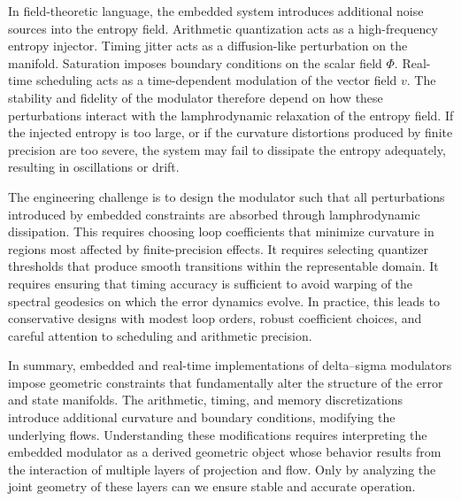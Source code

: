 In field-theoretic language, the embedded system introduces additional noise sources into the entropy field. Arithmetic quantization acts as a high-frequency entropy injector. Timing jitter acts as a diffusion-like perturbation on the manifold. Saturation imposes boundary conditions on the scalar field \(\Phi\). Real-time scheduling acts as a time-dependent modulation of the vector field \(v\). The stability and fidelity of the modulator therefore depend on how these perturbations interact with the lamphrodynamic relaxation of the entropy field. If the injected entropy is too large, or if the curvature distortions produced by finite precision are too severe, the system may fail to dissipate the entropy adequately, resulting in oscillations or drift.

The engineering challenge is to design the modulator such that all perturbations introduced by embedded constraints are absorbed through lamphrodynamic dissipation. This requires choosing loop coefficients that minimize curvature in regions most affected by finite-precision effects. It requires selecting quantizer thresholds that produce smooth transitions within the representable domain. It requires ensuring that timing accuracy is sufficient to avoid warping of the spectral geodesics on which the error dynamics evolve. In practice, this leads to conservative designs with modest loop orders, robust coefficient choices, and careful attention to scheduling and arithmetic precision.

In summary, embedded and real-time implementations of delta–sigma modulators impose geometric constraints that fundamentally alter the structure of the error and state manifolds. The arithmetic, timing, and memory discretizations introduce additional curvature and boundary conditions, modifying the underlying flows. Understanding these modifications requires interpreting the embedded modulator as a derived geometric object whose behavior results from the interaction of multiple layers of projection and flow. Only by analyzing the joint geometry of these layers can we ensure stable and accurate operation.


